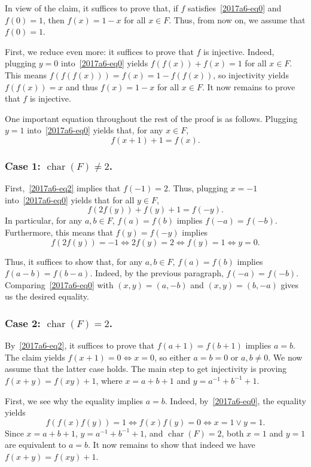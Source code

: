 \documentclass{article}
\DeclareMathOperator{\rchar}{char}
\begin{document}
In view of the claim, it suffices to prove that, if $f$ satisfies~\eqref{2017a6-eq0} and $f(0) = 1$, then $f(x) = 1 - x$ for all $x \in F$.
Thus, from now on, we assume that $f(0) = 1$.

First, we reduce even more: it suffices to prove that $f$ is injective.
Indeed, plugging $y = 0$ into~\eqref{2017a6-eq0} yields $f(f(x)) + f(x) = 1$ for all $x \in F$.
This means $f(f(f(x))) = f(x) = 1 - f(f(x))$, so injectivity yields $f(f(x)) = x$ and thus $f(x) = 1 - x$ for all $x \in F$.
It now remains to prove that $f$ is injective.

One important equation throughout the rest of the proof is as follows.
Plugging $y = 1$ into~\eqref{2017a6-eq0} yields that, for any $x \in F$,
\[ f(x + 1) + 1 = f(x). \tag{2}\label{2017a6-eq2} \]


\subsubsection*{Case 1: $\rchar(F) \neq 2$.}

First,~\eqref{2017a6-eq2} implies that $f(-1) = 2$.
Thus, plugging $x = -1$ into~\eqref{2017a6-eq0} yields that for all $y \in F$,
\[ f(2f(y)) + f(y) + 1 = f(-y). \]
In particular, for any $a, b \in F$, $f(a) = f(b)$ implies $f(-a) = f(-b)$.
Furthermore, this means that $f(y) = f(-y)$ implies
\[ f(2f(y)) = -1 \iff 2f(y) = 2 \iff f(y) = 1 \iff y = 0. \]

Thus, it suffices to show that, for any $a, b \in F$, $f(a) = f(b)$ implies $f(a - b) = f(b - a)$.
Indeed, by the previous paragraph, $f(-a) = f(-b)$.
Comparing~\eqref{2017a6-eq0} with $(x, y) = (a, -b)$ and $(x, y) = (b, -a)$ gives us the desired equality.


\subsubsection*{Case 2: $\rchar(F) = 2$.}

By~\eqref{2017a6-eq2}, it suffices to prove that $f(a + 1) = f(b + 1)$ implies $a = b$.
The claim yields $f(x + 1) = 0 \iff x = 0$, so either $a = b = 0$ or $a, b \neq 0$.
We now assume that the latter case holds.
The main step to get injectivity is proving $f(x + y) = f(xy) + 1$, where $x = a + b + 1$ and $y = a^{-1} + b^{-1} + 1$.

First, we see why the equality implies $a = b$.
Indeed, by~\eqref{2017a6-eq0}, the equality yields
\[ f(f(x) f(y)) = 1 \iff f(x) f(y) = 0 \iff x = 1 \lor y = 1. \]
Since $x = a + b + 1$, $y = a^{-1} + b^{-1} + 1$, and $\rchar(F) = 2$, both $x = 1$ and $y = 1$ are equivalent to $a = b$.
It now remains to show that indeed we have $f(x + y) = f(xy) + 1$.
\end{document}
